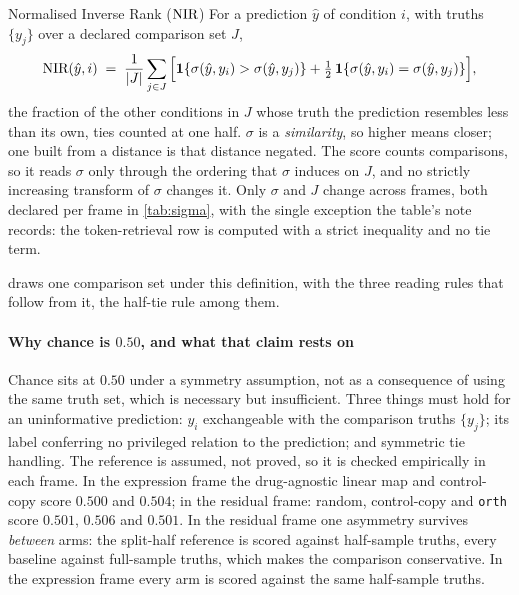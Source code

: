 \begin{defn}{Normalised Inverse Rank ($\textrm{NIR}$)}
For a prediction $\hat y$ of condition $i$, with truths $\{y_j\}$ over a declared
comparison set $J$,
\begin{equation}
 \textrm{NIR}(\hat{y}, i) \;=\; \frac{1}{|J|}\sum_{j \in J}
 \Big[\mathbf{1}\{\sigma(\hat{y}, y_i) > \sigma(\hat{y}, y_j)\}
 + \tfrac{1}{2}\,\mathbf{1}\{\sigma(\hat{y}, y_i) = \sigma(\hat{y}, y_j)\}\Big],
\end{equation}
the fraction of the other conditions in $J$ whose truth the prediction resembles
less than its own, ties counted at one half. $\sigma$ is a \emph{similarity}, so
higher means closer; one built from a distance is that distance negated. The
score counts comparisons, so it reads $\sigma$ only through the ordering that
$\sigma$ induces on $J$, and no strictly increasing transform of $\sigma$ changes
it. Only $\sigma$ and $J$ change across frames, both declared per frame in
\cref{tab:sigma}, with the single exception the table's note records: the
token-retrieval row is computed with a strict inequality and no tie term.
\end{defn}

 draws one comparison set under this definition, with the three
reading rules that follow from it, the half-tie rule among them.



\paragraph{Why chance is $0.50$, and what that claim rests on} Chance sits at
$0.50$ under a symmetry assumption, not as a consequence of using the same truth
set, which is necessary but insufficient. Three things must hold for an
uninformative prediction: $y_i$ exchangeable with the comparison truths
$\{y_j\}$; its label conferring no privileged relation to the prediction; and
symmetric tie handling. The reference is assumed, not proved, so it is checked
empirically in each frame. In the expression frame the drug-agnostic linear map
and control-copy score $0.500$ and $0.504$; in the residual frame: random,
control-copy and \texttt{orth} score $0.501$, $0.506$ and $0.501$. In the
residual frame one asymmetry survives \emph{between} arms: the split-half
reference is scored against half-sample truths, every baseline against
full-sample truths, which makes the comparison conservative. In the expression frame every
arm is scored against the same half-sample truths.

